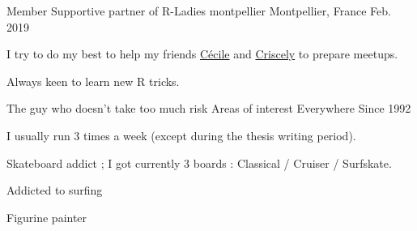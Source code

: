 

\begin{cventries}

  \cventry
    {Member} %
    {Supportive partner of R-Ladies montpellier} %
    {Montpellier, France} %
    {Feb. 2019} %
    {
      \begin{cvitems} %
        \item {I try to do my best to help my friends \href{https://github.com/cecilesauder}{Cécile} and \href{https://github.com/CriscelyLP}{Criscely} to prepare meetups.}
        \item {Always keen to learn new R tricks.}
      \end{cvitems}
    }

  \cventry
    {The guy who doesn't take too much risk} %
    {Areas of interest} %
    {Everywhere} %
    {Since 1992} %
    {
      \begin{cvitems} %
        \item {I usually run 3 times a week (except during the thesis writing period).}
        \item {Skateboard addict ; I got currently 3 boards : Classical / Cruiser / Surfskate.}
        \item {Addicted to surfing}
        \item {Figurine painter}
      \end{cvitems}
    }

\end{cventries}
